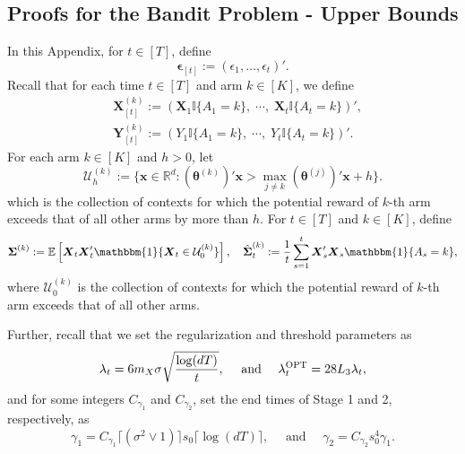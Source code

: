 \documentclass[aos,preprint]{imsart}
\theoremstyle{plain}
\theoremstyle{definition}
\newcommand{\btheta}{\boldsymbol{\theta}}
\newcommand{\bd}[1]{\boldsymbol{#1}}
\newcommand{\idf}{\mathbbm{1}}
\newcommand{\bX}{\boldsymbol{X}}
\newcommand{\bSigma}{\boldsymbol{\Sigma}}
\newcommand{\mR}{\mathbb{R}}
\newcommand{\bY}{\boldsymbol{Y}}
\newcommand{\hdlambda}{\lambda^{\textup{OPT}}}
\newcommand{\hbSigma}{\hat{\boldsymbol{\Sigma}}}
\newcommand{\bepsilon}{\bd{\epsilon}}
\newcommand{\Exp}{\mathbb{E}}
\begin{document}
\begin{appendix}
\section{Proofs for the Bandit Problem - Upper Bounds}
In this Appendix, for $t \in [T]$, define
\begin{equation}
    \label{def:bepsilon}
\bepsilon_{[t]}:=(\epsilon_1,\ldots,\epsilon_{t})'.
\end{equation}
Recall that for each time $t \in [T]$ and arm $k \in [K]$, we define
\begin{equation}\label{eq: bandit design matrix}
\begin{aligned}
    &\bX_{[t]}^{(k)} := \left(\bX_1 \mathbb{I}\{A_1 = k\},\; \cdots,\; \bX_t \mathbb{I}\{A_t = k\}\right)', \\
    &\bY_{[t]}^{(k)} := \left(Y_1 \mathbb{I}\{A_1 = k\},\; \cdots,\; Y_t \mathbb{I}\{A_t = k\}\right)'.
\end{aligned}
\end{equation}
For each arm $k\in [K]$ and $h>0$, let 
\begin{equation}\label{eq: U_h_k}
    \mathcal{U}_h^{(k)} := \{\bd{x}\in \mR^d: (\btheta^{(k)})'\bd{x}> \max_{j\ne k}(\btheta^{(j)})'\bd{x}+h\}.
\end{equation}
which is the collection of contexts for which the potential reward of $k$-th arm exceeds that of all other arms by more than $h$. For $t \in [T]$ and $k \in [K]$, define
\begin{equation}\label{eq: hbSigma}
\begin{split}
\bSigma^{(k)} := \Exp\left[\bX_t\bX_t'\idf\{\bX_{t} \in \mathcal{U}_{0}^{(k)}\}\right], \quad 
    \hbSigma_t^{(k)}:=\frac{1}{t}\sum_{s=1}^{t}\bX_s'\bX_s\idf\{A_s=k\},
\end{split}
\end{equation}
where $\mathcal{U}_{0}^{(k)}$ is the collection of contexts for which the potential reward of $k$-th arm exceeds that of all other arms.

Further, recall that we set the regularization and threshold parameters as
\begin{equation} \label{app_eq: bandit_paras_est}
\lambda_t = 6m_X\sigma\sqrt{\frac{\log (dT)}{t}},\quad \text{ and } \quad \hdlambda_t = 28L_3\lambda_t,
\end{equation}
and for some integers $C_{\gamma_1}$ and $C_{\gamma_2}$, set the end times of Stage 1 and 2, respectively, as
\begin{equation} \label{app_eq: end_times}
    \gamma_1 = C_{\gamma_1} \lceil(\sigma^2\vee 1)\rceil s_0 \lceil \log (dT) \rceil, \quad \text{ and } \quad \gamma_2 = C_{\gamma_2} s_0^4 \gamma_1.
\end{equation} 



\end{appendix}
\end{document}
